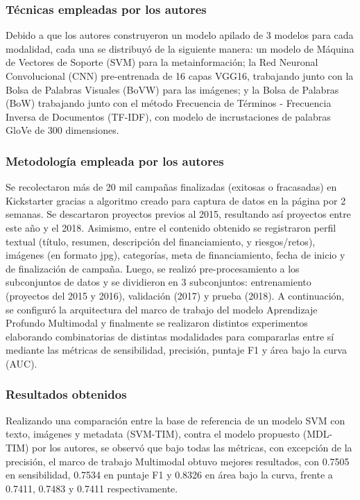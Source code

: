 \subsubsection{Técnicas empleadas por los autores}
Debido a que los autores construyeron un modelo apilado de 3 modelos para cada modalidad, cada una se distribuyó de la siguiente manera: un modelo de Máquina de Vectores de Soporte (SVM) para la metainformación; la Red Neuronal Convolucional (CNN) pre-entrenada de 16 capas VGG16, trabajando junto con la Bolsa de Palabras Visuales (BoVW) para las imágenes; y la Bolsa de Palabras (BoW) trabajando junto con el método Frecuencia de Términos - Frecuencia Inversa de Documentos (TF-IDF), con modelo de incrustaciones de palabras GloVe de 300 dimensiones.

\subsubsection{Metodología empleada por los autores}
Se recolectaron más de 20 mil campañas finalizadas (exitosas o fracasadas) en Kickstarter gracias a algoritmo creado para captura de datos en la página por 2 semanas. Se descartaron proyectos previos al 2015, resultando así proyectos entre este año y el 2018. Asimismo, entre el contenido obtenido se registraron perfil textual (título, resumen, descripción del financiamiento, y riesgos/retos), imágenes (en formato jpg), categorías, meta de financiamiento, fecha de inicio y de finalización de campaña. Luego, se realizó pre-procesamiento a los subconjuntos de datos y se dividieron en 3 subconjuntos: entrenamiento (proyectos del 2015 y 2016), validación (2017) y prueba (2018). A continuación, se configuró la arquitectura del marco de trabajo del modelo Aprendizaje Profundo Multimodal y finalmente se realizaron distintos experimentos elaborando combinatorias de distintas modalidades para compararlas entre sí mediante las métricas de sensibilidad, precisión, puntaje F1 y área bajo la curva (AUC).

\subsubsection{Resultados obtenidos}
Realizando una comparación entre la base de referencia de un modelo SVM con texto, imágenes y metadata (SVM-TIM), contra el modelo propuesto (MDL-TIM) por los autores, se observó que bajo todas las métricas, con excepción de la precisión, el marco de trabajo Multimodal obtuvo mejores resultados, con 0.7505 en sensibilidad, 0.7534 en puntaje F1 y 0.8326 en área bajo la curva, frente a 0.7411, 0.7483 y 0.7411 respectivamente.

